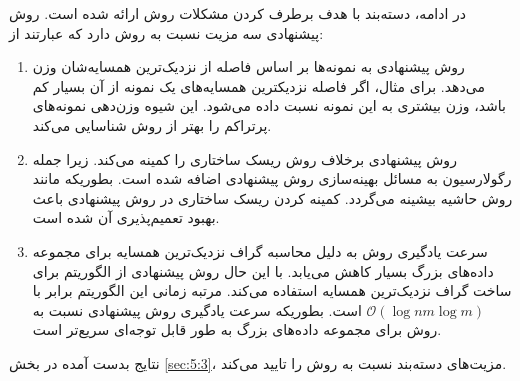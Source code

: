 در ادامه، دسته‌بند  با هدف برطرف کردن مشکلات روش  ارائه شده است. روش پیشنهادی  سه مزیت نسبت به روش   دارد که عبارتند از:
\begin{enumerate}
	\item روش پیشنهادی به نمونه‌ها بر اساس فاصله از نزدیک‌ترین همسایه‌شان وزن می‌دهد. برای مثال، اگر  فاصله نزدیکترین همسایه‌های یک نمونه از آن بسیار کم باشد، وزن بیشتری به این نمونه نسبت داده می‌شود. این شیوه وزن‌دهی نمونه‌های پرتراکم را بهتر  از روش   شناسایی می‌کند.
	\item روش پیشنهادی  برخلاف روش  ریسک ساختاری را کمینه می‌کند. زیرا جمله رگولارسیون به مسائل بهینه‌سازی روش پیشنهادی اضافه شده است. بطوریکه مانند روش   حاشیه بیشینه می‌گردد. کمینه کردن ریسک ساختاری در روش پیشنهادی باعث بهبود تعمیم‌پذیری آن شده است.
	\item سرعت یادگیری روش   به دلیل محاسبه گراف نزدیک‌ترین همسایه برای مجموعه داده‌های بزرگ بسیار کاهش می‌یابد. با  این حال روش پیشنهادی از الگوریتم  برای ساخت گراف نزدیک‌ترین همسایه استفاده می‌کند. مرتبه زمانی این الگوریتم برابر با   $\mathcal{O}(\log nm\log m)$ است. بطوریکه سرعت یادگیری روش پیشنهادی نسبت به روش  برای مجموعه داده‌های بزرگ به طور قابل    توجه‌ای سریع‌تر است. 
\end{enumerate} 

نتایج بدست آمده در بخش \ref{sec:5:3}، مزیت‌های دسته‌بند  نسبت به روش  را تایید می‌کند.

